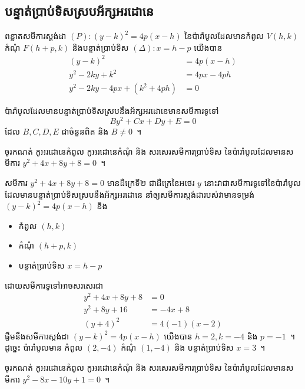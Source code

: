 \subsection{បន្ទាត់ប្រាប់ទិសស្របអ័ក្សអរដោនេ}
ពន្លាតសមីការស្ដង់ដា $ (P):(y-k)^2=4p(x-h) $ នៃប៉ារ៉ាបូលដែលមានកំពូល $ V(h,k) $ កំណុំ $ F(h+p,k) $ និងបន្ទាត់ប្រាប់ទិស $ (\Delta):x=h-p $ យើងបាន
\begin{align*}
(y-k)^2 &=4p(x-h)\\
y^2-2ky+k^2 &= 4px-4ph\\
y^2-2ky-4px+(k^2+4ph) &=0
\end{align*}
%
\begin{proposition*}
	ប៉ារ៉ាបូលដែលមានបន្ទាត់ប្រាប់ទិសស្របនឹងអ័ក្សអរដោនេមានសមីការទូទៅ
	\begin{equation}
	By^2+Cx+Dy+E=0
	\end{equation}
	ដែល $ B,C,D,E $ ជាចំនួនពិត និង $ B\neq 0 $~។
\end{proposition*}
%
\begin{example*}
	ចូរកណត់ កូអរដោនេ​កំពូល កូអរដោនេ​កំណុំ និង សរសេរសមីការប្រាប់ទិស នៃប៉ារ៉ាបូលដែលមានសមីការ $ y^2+4x+8y+8=0 $~។
\end{example*}
%
\begin{answer}
	សមីការ $ y^2+4x+8y+8=0 $ មានដឺក្រេទី២ ជាដឺក្រេនៃអថេរ $ y $ នោះវាជាសមីការទូទៅនៃប៉ារ៉ាបូលដែលមានបន្ទាត់ប្រាប់ទិសស្របនឹងអ័ក្សអរដោនេ នាំឲ្យសមីការស្តង់ដារបស់វាមានទម្រង់ $ (y-k)^2=4p(x-h) $ និង
	\begin{itemize}
		\item កំពូល $ (h,k) $
		\item កំណុំ $ (h+p,k) $
		\item បន្ទាត់ប្រាប់ទិស $ x=h-p $
	\end{itemize}
	ដោយសមីការទូទៅអាចសរសេរជា
	\begin{align*}
	y^2+4x+8y+8 &=0\\
	y^2+8y+16 &=-4x+8\\
	(y+4)^2 &=4(-1)(x-2)
	\end{align*}
	ផ្ទឹមនឹងសមីការស្តង់ដា $ (y-k)^2=4p(x-h) $ យើងបាន $ h=2,k=-4 $ និង $ p=-1 $~។ ដូច្នេះ ប៉ារ៉ាបូលមាន​ កំពូល $ (2,-4) $ កំណុំ $ (1,-4) $ និង បន្ទាត់ប្រាប់ទិស $ x=3 $~។
\end{answer}
%
\begin{example*}
	ចូរកណត់ កូអរដោនេ​កំពូល កូអរដោនេ​កំណុំ និង សរសេរសមីការប្រាប់ទិស នៃប៉ារ៉ាបូលដែលមានសមីការ $ y^2-8x-10y+1=0 $~។
\end{example*}
%
